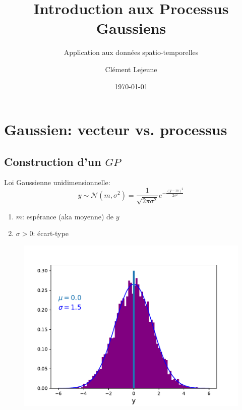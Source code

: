 \documentclass[xcolor=svgnames, t]{beamer}
\title[Introduction aux Processus Gaussiens]{Introduction aux Processus Gaussiens}
\subtitle{Application aux données spatio-temporelles}
\institute[]{}
\author[Cl\'ement Lejeune]{Cl\'ement Lejeune}
\institute[TSN/AD/AD3/IA]{
Thales Services Numériques,
\\ AD/AD3/IA
}
\date{\today}
\begin{document}
\frame{\titlepage}


\section{Gaussien: vecteur vs. processus}
\subsection{Construction d'un $GP$}
\begin{frame}{\subsecname}
  
% 
  Loi Gaussienne unidimensionnelle:
  \begin{equation*}
    y \sim \mathcal{N}(m, \sigma^2) = \frac{1}{\sqrt{2 \pi \sigma^2}} e^{-\frac{(y-m)^2}{2 \sigma^2}}
  \end{equation*}

  \begin{enumerate}
    \item $m$: espérance (aka moyenne) de $y$
    \item $\sigma > 0$: écart-type
  \end{enumerate}


  \begin{figure}
    \includegraphics[scale=0.4]{gaussian_1d.pdf}
  \end{figure}
\end{frame}
\end{document}
